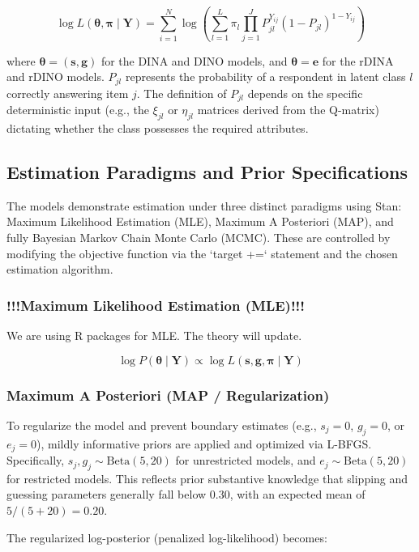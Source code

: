 \documentclass[11pt,a4paper]{article}
\begin{document}
$$ \log L(\boldsymbol{\theta}, \boldsymbol{\pi} \mid \mathbf{Y}) 
= \sum_{i=1}^N \log \left( \sum_{l=1}^L \pi_l 
\prod_{j=1}^J P_{jl}^{Y_{ij}} (1 - P_{jl})^{1 - Y_{ij}} \right) $$

where $\boldsymbol{\theta} = (\mathbf{s}, \mathbf{g})$ for the DINA and DINO models, 
and $\boldsymbol{\theta} = \mathbf{e}$ for the rDINA and rDINO models. 
$P_{jl}$ represents the probability of a respondent in latent class $l$ 
correctly answering item $j$. The definition of $P_{jl}$ depends on the 
specific deterministic input (e.g., the $\xi_{jl}$ or $\eta_{jl}$ matrices 
derived from the Q-matrix) dictating whether the class possesses 
the required attributes.

\subsection{Estimation Paradigms and Prior Specifications}
The models demonstrate estimation under three distinct paradigms using Stan: 
Maximum Likelihood Estimation (MLE), Maximum A Posteriori (MAP), 
and fully Bayesian Markov Chain Monte Carlo (MCMC). 
These are controlled by modifying the objective function via 
the `target +=` statement and the chosen estimation algorithm.

\subsubsection{!!!Maximum Likelihood Estimation (MLE)!!!}


We are using R packages for MLE. The theory will update.


$$ \log P(\boldsymbol{\theta} \mid \mathbf{Y}) 
\propto \log L(\mathbf{s}, \mathbf{g}, \boldsymbol{\pi} \mid \mathbf{Y}) $$



\subsubsection{Maximum A Posteriori (MAP / Regularization)}
To regularize the model and prevent boundary estimates (e.g., $s_j=0$, $g_j=0$, or $e_j=0$), 
mildly informative priors are applied and optimized via L-BFGS. 
Specifically, $s_j, g_j \sim \text{Beta}(5, 20)$ for unrestricted models, 
and $e_j \sim \text{Beta}(5, 20)$ for restricted models. 
This reflects prior substantive knowledge that slipping and guessing 
parameters generally fall below $0.30$, with an expected mean of $5 / (5+20) = 0.20$.

The regularized log-posterior (penalized log-likelihood) becomes:
\end{document}
